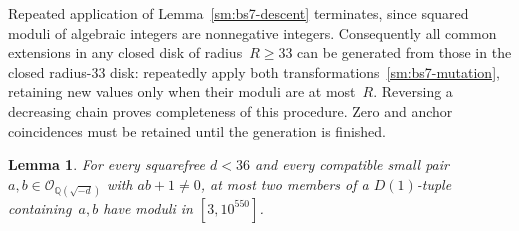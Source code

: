 \documentclass[12pt]{article}
\newtheorem{lemma}[theorem]{Lemma}
\numberwithin{equation}{section}
\begin{document}
Repeated application of Lemma~\ref{sm:bs7-descent} terminates, since squared moduli of algebraic integers are nonnegative integers. Consequently all common extensions in any closed disk of radius~$R\ge33$ can be generated from those in the closed radius-33 disk: repeatedly apply both transformations~\eqref{sm:bs7-mutation}, retaining new values only when their moduli are at most~$R$. Reversing a decreasing chain proves completeness of this procedure. Zero and anchor coincidences must be retained until the generation is finished.

\begin{lemma}\label{sm:bs7-finite-pairs}
For every squarefree $d<36$ and every compatible small pair $a,b\in\mathcal O_{\mathbb Q(\sqrt{-d})}$ with $ab+1\ne0$, at most two members of a $D(1)$-tuple containing~$a,b$ have moduli in $[3,10^{550}]$.
\end{lemma}
\end{document}
